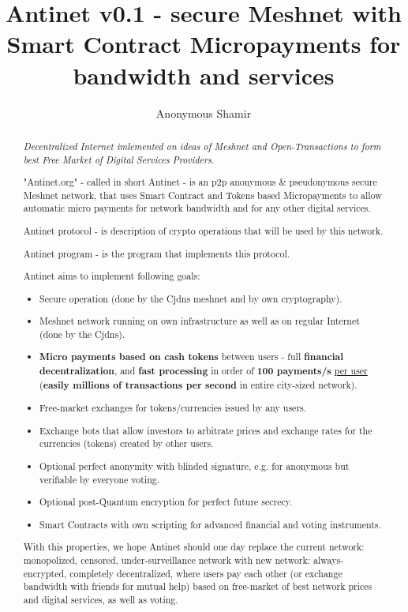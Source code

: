 \documentclass[a4paper,11pt]{article}
\title{Antinet v0.1 - secure Meshnet with Smart Contract Micropayments for bandwidth and services}
\author{Anonymous Shamir}
\begin{document}
\maketitle
\tableofcontents

\begin{abstract}

\textit{Decentralized Internet imlemented on ideas of Meshnet and Open-Transactions to form best Free Market of Digital Services Providers.}

"Antinet.org" - called in short Antinet - is an p2p anonymous \& pseudonymous secure Meshnet network, 
that uses Smart Contract and Tokens based Micropayments
to allow automatic micro payments for network bandwidth 
and for any other digital services.
\newline

Antinet protocol - is description of crypto operations that will be used by this network.
\newline

Antinet program - is the program that implements this protocol.
\newline

Antinet aims to implement following goals:
\begin{itemize}
  \item Secure operation (done by the Cjdns meshnet and by own cryptography).
  \item Meshnet network running on own infrastructure as well as on regular Internet (done by the Cjdns).
  \item \textbf{Micro payments based on cash tokens} between users - full \textbf{financial decentralization}, and \textbf{fast processing} in order of \textbf{100 payments/s} \underline{per user} 
  (\textbf{easily millions of transactions per second} in entire city-sized network).
  \item Free-market exchanges for tokens/currencies issued by any users.
  \item Exchange bots that allow investors to arbitrate prices and exchange rates for the currencies (tokens) created by other users.
  \item Optional perfect anonymity with blinded signature, e.g. for anonymous but verifiable by everyone voting.
  \item Optional post-Quantum encryption for perfect future secrecy.
  \item Smart Contracts with own scripting for advanced financial and voting instruments.
\end{itemize}

With this properties, we hope Antinet should one day replace the \newline
current network: monopolized, censored, under-surveillance network \newline
with new network: always-encrypted, completely decentralized, where users pay each other (or exchange bandwidth with friends for mutual help) \newline
based on free-market of best network prices and digital services, as well as voting.

\end{abstract}
\end{document}
